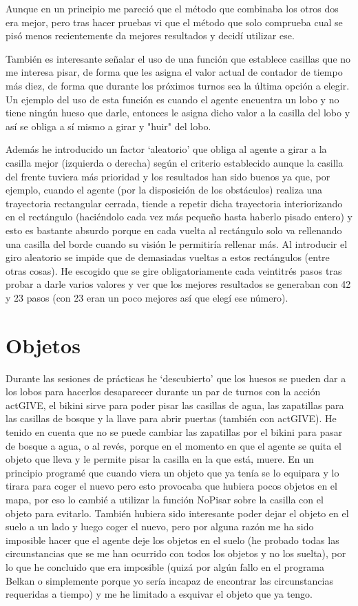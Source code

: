 \documentclass[a4paper, 11pt]{article}
\begin{document}
Aunque en un principio me pareció que el método que combinaba los otros dos era mejor, pero tras hacer pruebas vi que el método que solo comprueba cual se pisó menos recientemente da mejores resultados y decidí utilizar ese.

También es interesante señalar el uso de una función que establece casillas que no me interesa pisar, de forma que les asigna el valor actual de contador de tiempo más diez, de forma que durante los próximos turnos sea la última opción a elegir. Un ejemplo del uso de esta función es cuando el agente encuentra un lobo y no tiene ningún hueso que darle, entonces le asigna dicho valor a la casilla del lobo y así se obliga a sí mismo a girar y "huir" del lobo.

Además he introducido un factor `aleatorio' que obliga al agente a girar a la casilla mejor (izquierda o derecha) según el criterio establecido aunque la casilla del frente tuviera más prioridad y los resultados han sido buenos ya que, por ejemplo, cuando el agente (por la disposición de los obstáculos) realiza una trayectoria rectangular cerrada, tiende a repetir dicha trayectoria interiorizando en el rectángulo (haciéndolo cada vez más pequeño hasta haberlo pisado entero) y esto es bastante absurdo porque en cada vuelta al rectángulo solo va rellenando una casilla del borde cuando su visión le permitiría rellenar más. Al introducir el giro aleatorio se impide que de demasiadas vueltas a estos rectángulos (entre otras cosas). He escogido que se gire obligatoriamente cada veintitrés pasos tras probar a darle varios valores y ver que los mejores resultados se generaban con 42 y 23 pasos (con 23 eran un poco mejores así que elegí ese número).

\section{Objetos}
	Durante las sesiones de prácticas he `descubierto' que los huesos se pueden dar a los lobos para hacerlos desaparecer durante un par de turnos con la acción actGIVE, el bikini sirve para poder pisar las casillas de agua, las zapatillas para las casillas de bosque y la llave para abrir puertas (también con actGIVE). He tenido en cuenta que no se puede cambiar las zapatillas por el bikini para pasar de bosque a agua, o al revés, porque en el momento en que el agente se quita el objeto que lleva y le permite pisar la casilla en la que está, muere. 
	En un principio programé que cuando viera un objeto que ya tenía se lo equipara y lo tirara para coger el nuevo pero esto provocaba que hubiera pocos objetos en el mapa, por eso lo cambié a utilizar la función NoPisar sobre la casilla con el objeto para evitarlo. También hubiera sido interesante poder dejar el objeto en el suelo a un lado y luego coger el nuevo, pero por alguna razón me ha sido imposible hacer que el agente deje los objetos en el suelo (he probado todas las circunstancias que se me han ocurrido con todos los objetos y no los suelta), por lo que he concluido que era imposible (quizá por algún fallo en el programa Belkan o simplemente porque yo sería incapaz de encontrar las circunstancias requeridas a tiempo) y me he limitado a esquivar el objeto que ya tengo.
	
\end{document}
